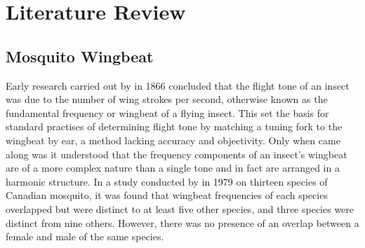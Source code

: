 \section{Literature Review}
\label{sec:bg-litreview}

    \subsection{Mosquito Wingbeat}
    \label{subsec:bg-litreview-mozz}
        
        Early research carried out by \textcite{Landois1866} in 1866 concluded that the flight tone of an insect was due to the number of wing strokes per second, otherwise known as the fundamental frequency or wingbeat of a flying insect. This set the basis for standard practises of determining flight tone by matching a tuning fork to the wingbeat by ear, a method lacking accuracy and objectivity. Only when \textcite{Williams1950} came along was it understood that the frequency components of an insect's wingbeat are of a more complex nature than a single tone and in fact are arranged in a harmonic structure. In a study conducted by \textcite{Belton1979} in 1979 on thirteen species of Canadian mosquito, it was found that wingbeat frequencies of each species overlapped but were distinct to at least five other species, and three species were distinct from nine others. However, there was no presence of an overlap between a female and male of the same species. 
        
